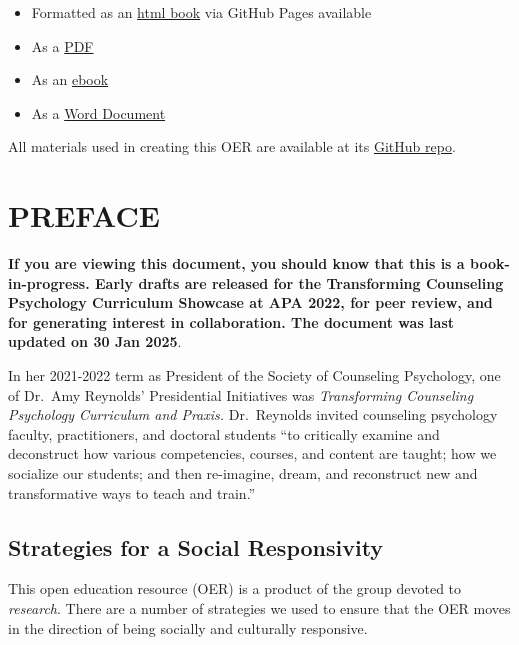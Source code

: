\documentclass[
  11pt,
]{book}
\providecommand{\tightlist}{%
  \setlength{\itemsep}{0pt}\setlength{\parskip}{0pt}}
\begin{document}
\begin{itemize}
\tightlist
\item
  Formatted as an \href{https://lhbikos.github.io/TransformingResearchMethods/}{html book} via GitHub Pages available
\item
  As a \href{https://github.com/lhbikos/TransformingResearchMethods/blob/main/docs/TransformingResearchMethods.pdf}{PDF}
\item
  As an \href{https://github.com/lhbikos/TransformingResearchMethods/blob/main/docs/TransformingResearchMethods.epub}{ebook}
\item
  As a \href{https://github.com/lhbikos/TransformingResearchMethods/blob/main/docs/TransformingResearchMethods.docx}{Word Document}
\end{itemize}

All materials used in creating this OER are available at its \href{https://github.com/lhbikos/TransformingResearchMethods}{GitHub repo}.

\chapter*{PREFACE}\label{preface}


\textbf{If you are viewing this document, you should know that this is a book-in-progress. Early drafts are released for the Transforming Counseling Psychology Curriculum Showcase at APA 2022, for peer review, and for generating interest in collaboration. The document was last updated on 30 Jan 2025}.

In her 2021-2022 term as President of the Society of Counseling Psychology, one of Dr.~Amy Reynolds' Presidential Initiatives was \emph{Transforming Counseling Psychology Curriculum and Praxis.} Dr.~Reynolds invited counseling psychology faculty, practitioners, and doctoral students ``to critically examine and deconstruct how various competencies, courses, and content are taught; how we socialize our students; and then re-imagine, dream, and reconstruct new and transformative ways to teach and train.''

\section*{Strategies for a Social Responsivity}\label{strategies-for-a-social-responsivity}


This open education resource (OER) is a product of the group devoted to \emph{research}. There are a number of strategies we used to ensure that the OER moves in the direction of being socially and culturally responsive.
\end{document}
